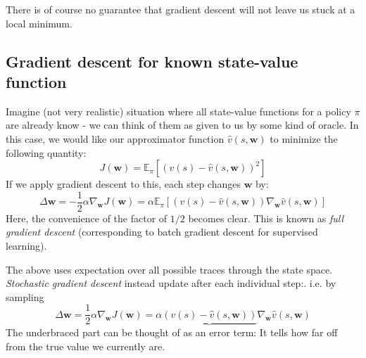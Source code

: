 \documentclass[12pt, a4paper]{article}
\numberwithin{equation}{section}
\begin{document}
There is of course no guarantee that gradient descent will not leave us stuck at a local minimum.

\subsection{Gradient descent for known state-value function}
Imagine (not very realistic) situation where all state-value functions for a policy $\pi$ are already know - we can think of them as given to us by some kind of oracle. In this case, we would like our approximator function $\hat{v}(s,\mathbf{w})$ to minimize the following quantity:
\begin{equation}
J(\mathbf{w})=\mathbb{E}_\pi[(v(s)-\hat{v}(s,\mathbf{w}))^2]
\end{equation}
If we apply gradient descent to this, each step changes $\mathbf{w}$ by:
\begin{equation}
\Delta\mathbf{w}=-\frac{1}{2}\alpha\nabla_\mathbf{w}J(\mathbf{w})=\alpha\mathbb{E}_\pi[(v(s)-\hat{v}(s,\mathbf{w}))\nabla_\mathbf{w}\hat{v}(s,\mathbf{w})]
\end{equation}
Here, the convenience of the factor of $1/2$ becomes clear. This is known as \textit{full gradient descent} (corresponding to batch gradient descent for supervised learning).

The above uses expectation over all possible traces through the state space. \textit{Stochastic gradient descent} instead update after each individual step:. i.e. by sampling
\begin{equation}
\Delta\mathbf{w}=\frac{1}{2}\alpha\nabla_\mathbf{w}J(\mathbf{w})=\alpha\underbrace{(v(s)-\hat{v}(s,\mathbf{w}))}\nabla_\mathbf{w}\hat{v}(s,\mathbf{w})
\end{equation}
The underbraced part can be thought of as an error term: It tells how far off from the true value we currently are.
\end{document}
